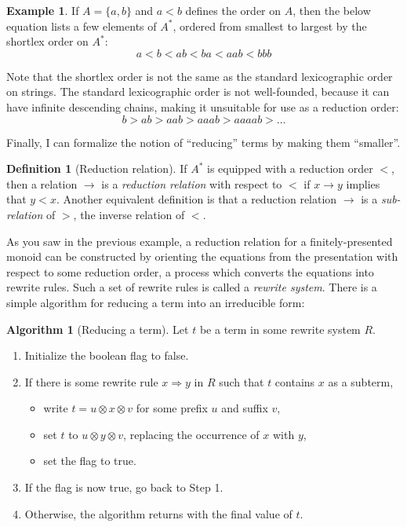 \documentclass[a4paper,headsepline,bibliography=totoc,toc=flat,fleqn,twoside=semi]{scrbook}
\theoremstyle{definition}
\newtheorem{definition}{Definition}[chapter]
\theoremstyle{definition}
\newtheorem{example}{Example}[chapter]
\theoremstyle{definition}
\newtheorem{algorithm}{Algorithm}[chapter]
\begin{document}
\begin{example} If $A=\{a,b\}$ and $a<b$ defines the order on $A$, then the below equation lists a few elements of $A^*$, ordered from smallest to largest by the shortlex order on $A^*$:
\[a<b<ab<ba<aab<bbb\]
\end{example}

Note that the shortlex order is not the same as the standard lexicographic order on strings. The standard lexicographic order is not well-founded, because it can have infinite descending chains, making it unsuitable for use as a reduction order:
\[b>ab>aab>aaab>aaaab>\ldots\]

Finally, I can formalize the notion of ``reducing'' terms by making them ``smaller''.
\begin{definition}[Reduction relation]\label{transinvdef} If $A^*$ is equipped with a reduction order $<$, then a relation $\rightarrow$ is a \emph{reduction relation} with respect to $<$ if $x\rightarrow y$ implies that $y<x$. Another equivalent definition is that a reduction relation $\rightarrow$ is a \emph{sub-relation} of $>$, the inverse relation of $<$. 
\end{definition}
As you saw in the previous example, a reduction relation for a finitely-presented monoid can be constructed by orienting the equations from the presentation with respect to some reduction order, a process which converts the equations into rewrite rules. Such a set of rewrite rules is called a \emph{rewrite system}. There is a simple algorithm for reducing a term into an irreducible form:
\begin{algorithm}[Reducing a term]\label{reducingaterm} Let $t$ be a term in some rewrite system $R$.
\begin{enumerate}
\item Initialize the boolean flag to false.
\item If there is some rewrite rule $x\Rightarrow y$ in $R$ such that $t$ contains $x$ as a subterm,
\begin{itemize}
\item write $t=u\otimes x\otimes v$ for some prefix $u$ and suffix $v$,
\item set $t$ to $u\otimes y\otimes v$, replacing the occurrence of $x$ with $y$,
\item set the flag to true.
\end{itemize}
\item If the flag is now true, go back to Step 1.
\item Otherwise, the algorithm returns with the final value of $t$.
\end{enumerate}
\end{algorithm}
\end{document}
